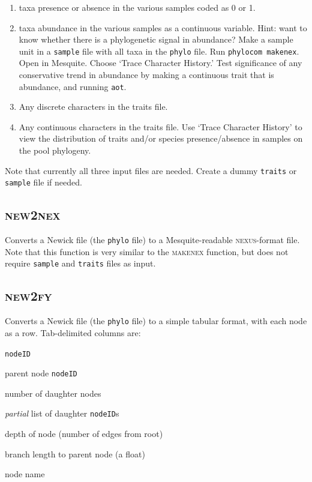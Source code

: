 \documentclass[12pt,letterpaper]{article}
\begin{document}
\begin{enumerate}
\item taxa presence or absence in the various samples coded as 0 or 1.
\item taxa abundance in the various samples as a continuous
  variable. Hint: want to know whether there is a phylogenetic signal
  in abundance? Make a sample unit in a \verb|sample| file with all
  taxa in the \verb|phylo| file. Run \verb|phylocom makenex|. Open in
  Mesquite. Choose `Trace Character History.' Test significance of any
  conservative trend in abundance by making a continuous trait that is
  abundance, and running \verb|aot|.
\item Any discrete characters in the traits file.
\item Any continuous characters in the traits file. 
Use `Trace Character History' to view the distribution of traits
and/or species presence/absence in samples on the pool phylogeny.
\end{enumerate}

Note that currently all three input files are needed.  Create a dummy
\verb|traits| or \verb|sample| file if needed.

\subsection{\scshape new2nex}

Converts a Newick file (the \verb|phylo| file) to a Mesquite-readable
{\scshape nexus}-format file. Note that this function is very similar
to the {\scshape makenex} function, but does not require \verb|sample| and
\verb|traits| files as input.

\subsection{\scshape new2fy}

Converts a Newick file (the \verb|phylo| file) to a simple tabular
format, with each node as a row.  Tab-delimited columns are:
\begin{compactitem}
\item \verb|nodeID|
\item parent node \verb|nodeID|
\item number of daughter nodes
\item {\it partial} list of daughter \verb|nodeID|s
\item depth of node (number of edges from root)
\item branch length to parent node (a float)
\item node name
\end{compactitem}
\end{document}
